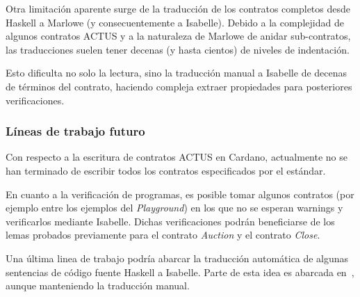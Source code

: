 \documentclass[12pt]{book}
\begin{document}
Otra limitación aparente surge de la traducción de los contratos completos desde Haskell a Marlowe (y consecuentemente a Isabelle). Debido a la complejidad de algunos contratos ACTUS y a la naturaleza de Marlowe de anidar sub-contratos, las traducciones suelen tener decenas (y hasta cientos) de niveles de indentación.

Esto dificulta no solo la lectura, sino la traducción manual a Isabelle de decenas de términos del contrato, haciendo compleja extraer propiedades para posteriores verificaciones.


\subsubsection{Líneas de trabajo futuro}

Con respecto a la escritura de contratos ACTUS en Cardano, actualmente no se han terminado de escribir todos los contratos especificados por el estándar.

En cuanto a la verificación de programas, es posible tomar algunos contratos (por ejemplo entre los ejemplos del \textit{Playground}) en los que no se esperan warnings y verificarlos mediante Isabelle. Dichas verificaciones podrán beneficiarse de los lemas probados previamente para el contrato \textit{Auction} y el contrato \textit{Close}.

Una última linea de trabajo podría abarcar la traducción automática de algunas sentencias de código fuente Haskell a Isabelle. Parte de esta idea es abarcada en~\cite{translating-haskell-to-isabelle}, aunque manteniendo la traducción manual.





\end{document}
